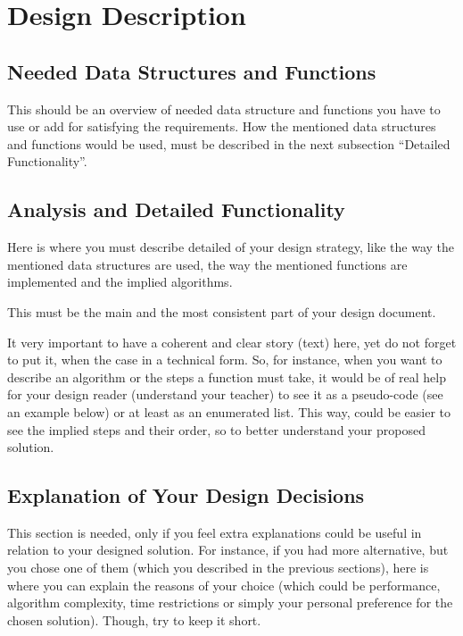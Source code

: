 \section{Design Description}

\subsection{Needed Data Structures and Functions}

This should be an overview of needed data structure and functions you have to use or add for satisfying the requirements. How the mentioned data structures and functions would be used, must be described in the next subsection ``Detailed Functionality''.


\subsection{Analysis and Detailed Functionality}
Here is where you must describe detailed of your design strategy, like the way the mentioned data structures are used, the way the mentioned functions are implemented and the implied algorithms. 

This must be the main and the most consistent part of your design document.

It very important to have a coherent and clear story (text) here, yet do not forget to put it, when the case in a technical form. So, for instance, when you want to describe an algorithm or the steps a function must take, it would be of real help for your design reader (understand your teacher) to see it as a pseudo-code (see an example below) or at least as an enumerated list. This way, could be easier to see the implied steps and their order, so to better understand your proposed solution.


\subsection{Explanation of Your Design Decisions}

This section is needed, only if you feel extra explanations could be useful in relation to your designed solution. For instance, if you had more alternative, but you chose one of them (which you described in the previous sections), here is where you can explain the reasons of your choice (which could be performance, algorithm complexity, time restrictions or simply your personal preference for the chosen solution). Though, try to keep it short. 

